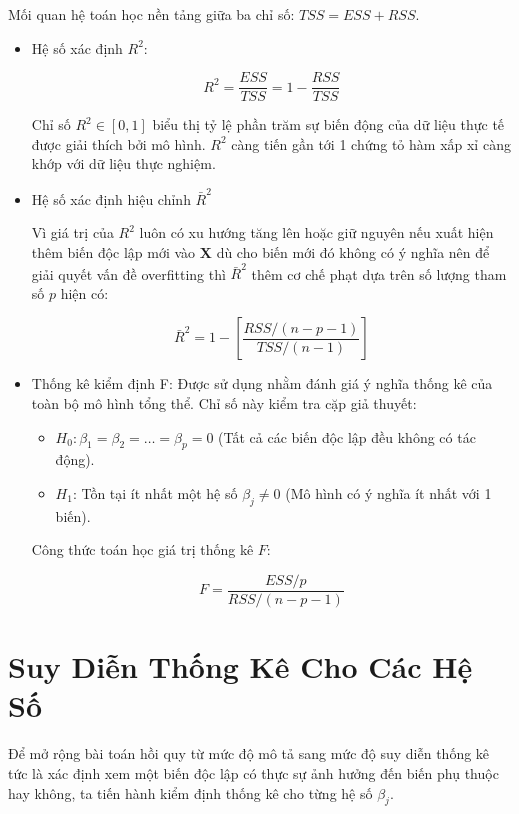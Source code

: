 Mối quan hệ toán học nền tảng giữa ba chỉ số: $TSS = ESS + RSS$.

\begin{itemize}[topsep=0pt, itemsep=2.5pt, leftmargin=1.5cm]
    \item Hệ số xác định $R^2$:

    $$R^2 = \frac{ESS}{TSS} = 1 - \frac{RSS}{TSS}$$

    Chỉ số $R^2 \in [0, 1]$ biểu thị tỷ lệ phần trăm sự biến động của dữ liệu thực tế được giải thích bởi mô hình. $R^2$ càng tiến gần tới 1 chứng tỏ hàm xấp xỉ càng khớp với dữ liệu thực nghiệm.

    \item Hệ số xác định hiệu chỉnh $\bar{R}^2$

    Vì giá trị của $R^2$ luôn có xu hướng tăng lên hoặc giữ nguyên nếu xuất hiện thêm biến độc lập mới vào $\mathbf{X}$ dù cho biến mới đó không có ý nghĩa nên để giải quyết vấn đề overfitting thì $\bar{R}^2$ thêm cơ chế phạt dựa trên số lượng tham số $p$ hiện có:

    $$\bar{R}^2 = 1 - \left[ \frac{RSS/(n - p - 1)}{TSS/(n - 1)} \right]$$

    \item Thống kê kiểm định F: Được sử dụng nhằm đánh giá ý nghĩa thống kê của toàn bộ mô hình tổng thể. Chỉ số này kiểm tra cặp giả thuyết:

    \begin{itemize}[label=, leftmargin=1.5cm]
        \item $H_0: \beta_1 = \beta_2 = \dots = \beta_p = 0$ (Tất cả các biến độc lập đều không có tác động).
        \item $H_1$: Tồn tại ít nhất một hệ số $\beta_j \neq 0$ (Mô hình có ý nghĩa ít nhất với 1 biến).
    \end{itemize}

    Công thức toán học giá trị thống kê $F$:

    $$F = \frac{ESS / p}{RSS / (n - p - 1)}$$

\end{itemize}

\section{Suy Diễn Thống Kê Cho Các Hệ Số}

Để mở rộng bài toán hồi quy từ mức độ mô tả sang mức độ suy diễn thống kê tức là xác định xem một biến độc lập có thực sự ảnh hưởng đến biến phụ thuộc hay không, ta tiến hành kiểm định thống kê cho từng hệ số $\beta_j$.

